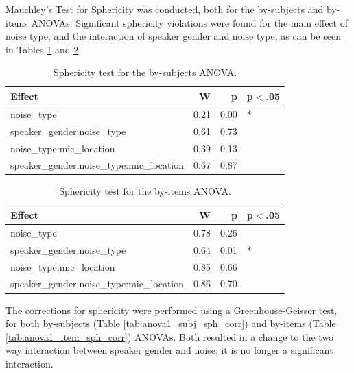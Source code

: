 \documentclass[dissertation,copyright]{uathesis}
\begin{document}
Mauchley's Test for Sphericity was conducted, both for the by-subjects and by-items ANOVAs.  Significant sphericity violations were found for the main effect of noise type, and the interaction of speaker gender and noise type, as can be seen in Tables \ref{tab:anova1_subj_sph_test} and \ref{tab:anova1_item_sph_test}. 

\begin{table}[ht]
\centering
\begin{tabular}{lrrl}
  \hline
Effect & W & p & p$<$.05 \\ 
  \hline
noise\_type & 0.21 & 0.00 & * \\ 
  speaker\_gender:noise\_type & 0.61 & 0.73 &  \\ 
  noise\_type:mic\_location & 0.39 & 0.13 &  \\ 
  speaker\_gender:noise\_type:mic\_location & 0.67 & 0.87 &  \\ 
   \hline
\end{tabular}
\caption{Sphericity test for the by-subjects ANOVA.} 
\label{tab:anova1_subj_sph_test}
\end{table}
\begin{table}[ht]
\centering
\begin{tabular}{lrrl}
  \hline
Effect & W & p & p$<$.05 \\ 
  \hline
noise\_type & 0.78 & 0.26 &  \\ 
  speaker\_gender:noise\_type & 0.64 & 0.01 & * \\ 
  noise\_type:mic\_location & 0.85 & 0.66 &  \\ 
  speaker\_gender:noise\_type:mic\_location & 0.86 & 0.70 &  \\ 
   \hline
\end{tabular}
\caption{Sphericity test for the by-items ANOVA.} 
\label{tab:anova1_item_sph_test}
\end{table}

The corrections for sphericity were performed using a Greenhouse-Geisser test, for both by-subjects (Table \ref{tab:anova1_subj_sph_corr}) and by-items (Table \ref{tab:anova1_item_sph_corr}) ANOVAs.  Both resulted in a change to the two way interaction between speaker gender and noise; it is no longer a significant interaction.
\end{document}
